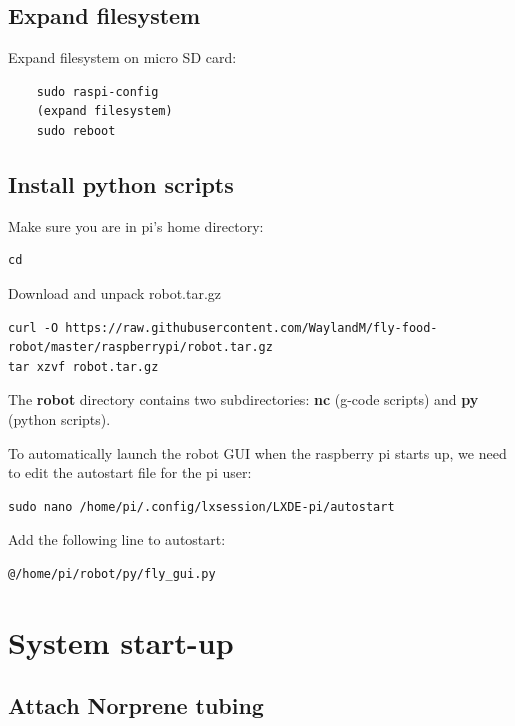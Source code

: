 \documentclass[]{book}
\theoremstyle{definition}
\theoremstyle{definition}
\theoremstyle{definition}
\theoremstyle{remark}
\begin{document}
\section{Expand filesystem}\label{expand-filesystem}

Expand filesystem on micro SD card:

\begin{verbatim}
    sudo raspi-config
    (expand filesystem)
    sudo reboot
\end{verbatim}

\section{Install python scripts}\label{installScripts}

Make sure you are in pi's home directory:

\begin{verbatim}
cd
\end{verbatim}

Download and unpack robot.tar.gz

\begin{verbatim}
curl -O https://raw.githubusercontent.com/WaylandM/fly-food-robot/master/raspberrypi/robot.tar.gz
tar xzvf robot.tar.gz
\end{verbatim}

The \textbf{robot} directory contains two subdirectories: \textbf{nc}
(g-code scripts) and \textbf{py} (python scripts).

To automatically launch the robot GUI when the raspberry pi starts up,
we need to edit the autostart file for the pi user:

\begin{verbatim}
sudo nano /home/pi/.config/lxsession/LXDE-pi/autostart
\end{verbatim}

Add the following line to autostart:

\begin{verbatim}
@/home/pi/robot/py/fly_gui.py
\end{verbatim}

\chapter{System start-up}\label{startup}

\section{Attach Norprene tubing}\label{attach-norprene-tubing}
\end{document}
